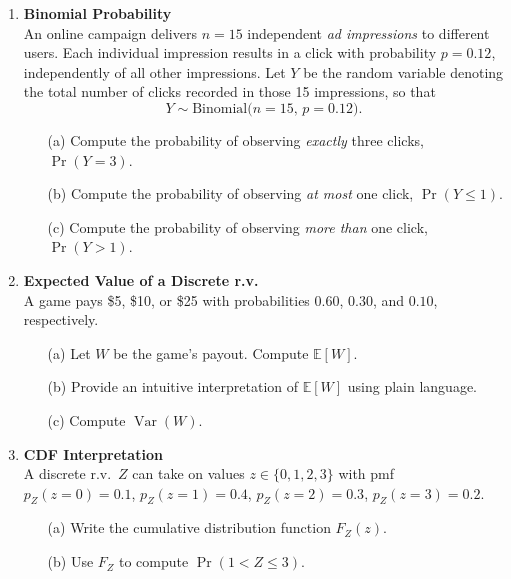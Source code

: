 \documentclass{article}
\begin{document}
\begin{enumerate}
    \item \textbf{Binomial Probability}  \\
          An online campaign delivers $n=15$ independent \emph{ad impressions} to different users.  
          Each individual impression results in a click with probability $p = 0.12$, independently of all other impressions.  
          Let $Y$ be the random variable denoting the total number of clicks recorded in those 15 impressions, so that
          \[
          Y \sim \text{Binomial}\!\bigl(n=15,\,p=0.12\bigr).
          \]
          \begin{enumerate}
            \item[(a)] Compute the probability of observing \emph{exactly} three clicks, $\Pr(Y = 3)$.  
            \item[(b)] Compute the probability of observing \emph{at most} one click, $\Pr(Y \le 1)$.  
            \item[(c)] Compute the probability of observing \emph{more than} one click, $\Pr(Y > 1)$.  
          \end{enumerate}
    
    \item \textbf{Expected Value of a Discrete r.v.}  \\
          A game pays \$5, \$10, or \$25 with probabilities $0.60$, $0.30$, and $0.10$, respectively.  
          \begin{enumerate}
              \item[(a)] Let $W$ be the game's payout.  Compute $\mathbb{E}[W]$.  
              \item[(b)] Provide an intuitive interpretation of $\mathbb{E}[W]$ using plain language.
              \item[(c)] Compute $\operatorname{Var}(W)$.  
          \end{enumerate}

    \item \textbf{CDF Interpretation}  \\
          A discrete r.v.\ $Z$  can take on values $z \in \{0,1,2,3\}$ with pmf $p_Z(z=0)=0.1$, $p_Z(z=1)=0.4$, $p_Z(z=2)=0.3$, $p_Z(z=3)=0.2$.  
          \begin{enumerate}
              \item[(a)] Write the cumulative distribution function $F_Z(z)$.  
              \item[(b)] Use $F_Z$ to compute $\Pr(1<Z\le 3)$.  
          \end{enumerate}


\end{enumerate}
\end{document}

